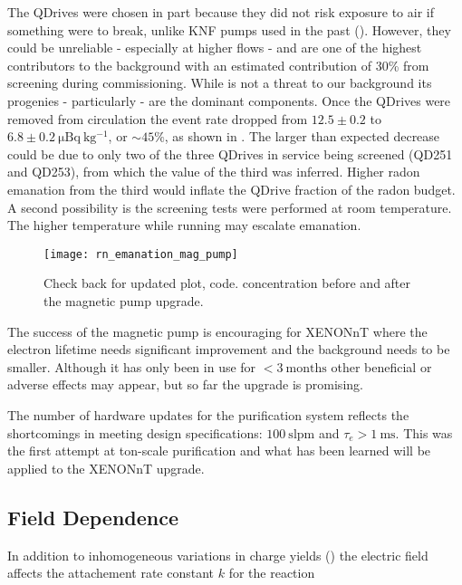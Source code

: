 The QDrives were chosen in part because they did not risk exposure to air if something were to
break, unlike KNF pumps used in the past ().  However, they could be unreliable - especially at higher flows - and
are one of the highest contributors to the 
background with an estimated contribution of 30\% from screening during commissioning.  While  is not a threat to our
background its progenies - particularly  - are the dominant components.  Once the QDrives were removed from circulation the
 event rate dropped from $12.5 \pm 0.2$ to
$6.8 \pm 0.2\ \mathrm{\mu Bq\ kg^{-1}}$, or ${\sim} 45\%$, as shown in .  The larger
than expected decrease could be due to only two of the three
QDrives in service being screened (QD251 and QD253), from which the value of the third was inferred.  Higher radon emanation from the
third would inflate
the QDrive fraction of the radon budget.  A second possibility is the screening tests were performed at room temperature.  The higher
temperature while running may escalate emanation.

\begin{figure}
\centering
\texttt{[image: rn\_emanation\_mag\_pump]}
\caption{Check back for updated plot, code.   concentration before and after the magnetic pump upgrade.}
\label{fig:electron_lifetime_model_ops_rn_emanation}
\end{figure}

The success of the magnetic pump is encouraging for XENONnT where the electron lifetime needs significant improvement and the background
needs to be smaller.  Although it has only been in use for $< 3\ \mathrm{months}$ other beneficial or adverse effects may appear, but so
far the upgrade is promising.

The number of hardware updates for the purification system reflects the shortcomings in meeting design specifications:
$100\ \mathrm{slpm}$ and $\tau_e > 1\ \mathrm{ms}$.  This was the first attempt at ton-scale purification and what has been learned will
be applied to the XENONnT upgrade.



\subsection{Field Dependence}
\label{subsec:electron_lifetime_model_field}
In addition to inhomogeneous variations in charge yields () the electric field affects
the attachement rate constant $k$ for the reaction

